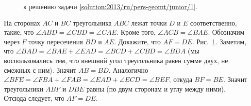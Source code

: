 \ifsolution
\begin{figure}\centering
    \caption{к решению задачи \ref{solution:2013/ru/pers-geomt/junior/1}.}
    \label{fig:solution:2013/ru/pers-geomt/junior/1}
\end{figure}
\fi %

\problem
На сторонах $AC$ и $BC$ треугольника $ABC$ лежат точки $D$ и $E$
соответственно, такие, что $\angle ABD = \angle CBD = \angle CAE$.
Кроме того, $\angle ACB = \angle BAE$.
Обозначим через $F$ точку пересечения $BD$ и $AE$.
Докажите, что $AF = DE$.
\solution
\label{solution:2013/ru/pers-geomt/junior/1}
Рис.~\ref{fig:solution:2013/ru/pers-geomt/junior/1}.
Заметим, что
\(
    \angle BAD = \angle BAE + \angle EAD
=
    \angle BCD + \angle CBD = \angle BDA
\)
(мы воспользовались тем, что внешний угол треугольника равен сумме двух, не
смежных с ним).
Значит $AB = BD$.
Аналогично
\(
    \angle BFE = \angle FBA + \angle FAB
=
    \angle EAD + \angle ECD = \angle BEF
\), откуда $BF=BE$.
Значит треугольники $ABF$ и $DBE$ равны (по двум сторонам и углу между ними).
Отсюда следует, что $AF = DE$.
\endproblem
